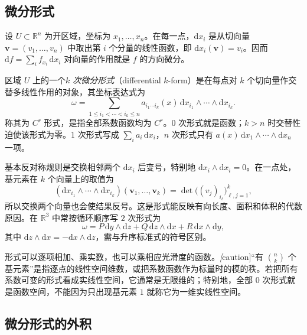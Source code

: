 \documentclass[UTF8,12pt,a4paper,fontset=fandol]{ctexbook}
\begin{document}
\subsection{微分形式}
\label{subsec:differential-forms}

设 $U\subset\mathbb R^n$ 为开区域，坐标为 $x_1,\ldots,x_n$。在每一点，$\mathrm dx_i$ 是从切向量 $\boldsymbol v=(v_1,\ldots,v_n)$ 中取出第 $i$ 个分量的线性函数，即 $\mathrm dx_i(\boldsymbol v)=v_i$。因而 $\mathrm df=\sum_i f_{x_i}\,\mathrm dx_i$ 对向量的作用就是 $f$ 的方向微分。

\begin{definition}
\label{def:differential-k-form}
区域 $U$ 上的一个\emph{$k$ 次微分形式}（differential $k$-form）是在每点对 $k$ 个切向量作交替多线性作用的对象，其坐标表达式为
\begin{equation}
\label{eq:differential-form-standard}
    \omega=\sum_{1\leq i_1<\cdots<i_k\leq n}
    a_{i_1\cdots i_k}(x)\,
    \mathrm dx_{i_1}\wedge\cdots\wedge\mathrm dx_{i_k}.
\end{equation}
称其为 $C^r$ 形式，是指全部系数函数均为 $C^r$。$0$ 次形式就是函数；$k>n$ 时交替性迫使该形式为零。$1$ 次形式写成 $\sum_i a_i\,\mathrm dx_i$，$n$ 次形式只有 $a(x)\,\mathrm dx_1\wedge\cdots\wedge\mathrm dx_n$ 一项。
\end{definition}

基本反对称规则是交换相邻两个 $\mathrm dx_i$ 后变号，特别地 $\mathrm dx_i\wedge\mathrm dx_i=0$。在一点处，基元素在 $k$ 个向量上的取值为
\[
    (\mathrm dx_{i_1}\wedge\cdots\wedge\mathrm dx_{i_k})
    (\boldsymbol v_1,\ldots,\boldsymbol v_k)
    =\det\bigl((v_j)_{i_\ell}\bigr)_{\ell,j=1}^k,
\]
所以交换两个向量也会使结果反号。这是形式能反映有向长度、面积和体积的代数原因。在 $\mathbb R^3$ 中常按循环顺序写 $2$ 次形式为
\[
    \omega=P\,\mathrm dy\wedge\mathrm dz+Q\,\mathrm dz\wedge\mathrm dx
           +R\,\mathrm dx\wedge\mathrm dy,
\]
其中 $\mathrm dz\wedge\mathrm dx=-\mathrm dx\wedge\mathrm dz$，需与升序标准式的符号区别。

形式可以逐项相加、乘实数，也可以乘相应光滑度的函数。\emph[caution]{“有 $\binom nk$ 个基元素”是指逐点的线性空间维数，或把系数函数作为标量时的模的秩。}若把所有系数可变的形式看成实线性空间，它通常是无限维的；特别地，全部 $0$ 次形式就是函数空间，不能因为只出现基元素 $1$ 就称它为一维实线性空间。

\subsection{微分形式的外积}
\label{subsec:exterior-products-of-differential-forms}
\end{document}
